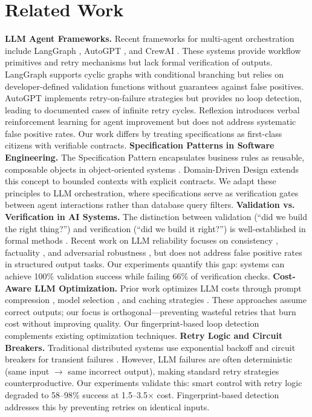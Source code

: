 \documentclass{article}
\begin{document}
\section{Related Work}
\textbf{LLM Agent Frameworks.} Recent frameworks for multi-agent orchestration include LangGraph \citep{langchain2024langgraph}, AutoGPT \citep{autogpt2023}, and CrewAI \citep{crewai2024}. These systems provide workflow primitives and retry mechanisms but lack formal verification of outputs. LangGraph supports cyclic graphs with conditional branching but relies on developer-defined validation functions without guarantees against false positives. AutoGPT implements retry-on-failure strategies but provides no loop detection, leading to documented cases of infinite retry cycles. Reflexion \citep{shinn2024reflexion} introduces verbal reinforcement learning for agent improvement but does not address systematic false positive rates. Our work differs by treating specifications as first-class citizens with verifiable contracts.
\textbf{Specification Patterns in Software Engineering.} The Specification Pattern encapsulates business rules as reusable, composable objects in object-oriented systems \citep{evans2006domain}. Domain-Driven Design \citep{evans2003domain} extends this concept to bounded contexts with explicit contracts. We adapt these principles to LLM orchestration, where specifications serve as verification gates between agent interactions rather than database query filters.
\textbf{Validation vs. Verification in AI Systems.} The distinction between validation (``did we build the right thing?'') and verification (``did we build it right?'') is well-established in formal methods \citep{clarke1999model}. Recent work on LLM reliability focuses on consistency \citep{wang2023selfconsistency}, factuality \citep{min2023factscore}, and adversarial robustness \citep{zou2023universal}, but does not address false positive rates in structured output tasks. Our experiments quantify this gap: systems can achieve 100\% validation success while failing 66\% of verification checks.
\textbf{Cost-Aware LLM Optimization.} Prior work optimizes LLM costs through prompt compression \citep{wingate2022prompt}, model selection \citep{jiang2023llmrouter}, and caching strategies \citep{bang2023caching}. These approaches assume correct outputs; our focus is orthogonal---preventing wasteful retries that burn cost without improving quality. Our fingerprint-based loop detection complements existing optimization techniques.
\textbf{Retry Logic and Circuit Breakers.} Traditional distributed systems use exponential backoff and circuit breakers for transient failures \citep{nygard2018release}. However, LLM failures are often deterministic (same input $\rightarrow$ same incorrect output), making standard retry strategies counterproductive. Our experiments validate this: smart control with retry logic degraded to 58--98\% success at 1.5--3.5$\times$ cost. Fingerprint-based detection addresses this by preventing retries on identical inputs.
\end{document}
